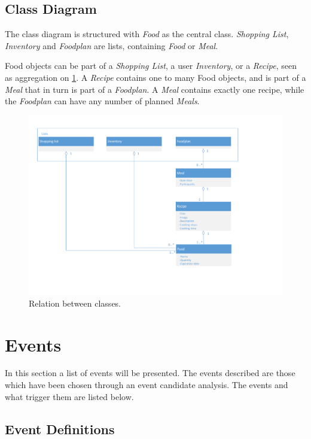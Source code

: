 \subsection{Class Diagram}
The class diagram is structured with \textit{Food} as the central class. 
\textit{Shopping List}, \textit{Inventory} and \textit{Foodplan} are lists, containing \textit{Food} or \textit{Meal}.

Food objects can be part of a \textit{Shopping List}, a user \textit{Inventory}, or a \textit{Recipe}, seen as aggregation on \cref{fig:classDiagram}. A \textit{Recipe} contains one to many Food objects, and is part of a \textit{Meal} that in turn is part of a \textit{Foodplan}. A \textit{Meal} contains exactly one recipe, while the \textit{Foodplan} can have any number of planned \textit{Meals}.

\begin{figure}[H]
	\centering
	\includegraphics[clip=true, width=1\textwidth, trim=1cm 3cm 4cm 0]{Development/Klasseting}
	\caption{Relation between classes.}
	\label{fig:classDiagram} 
\end{figure}

\section{Events} \label{EventsSection}
In this section a list of events will be presented. The events described are those which have been chosen through an event candidate analysis. The events and what trigger them are listed below.

\subsection{Event Definitions}

